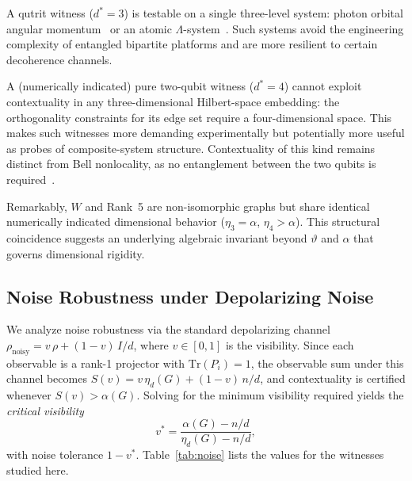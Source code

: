 \documentclass[aps,pra,twocolumn,superscriptaddress,longbibliography,floatfix]{revtex4-2}
\newcommand{\vt}{\vartheta}
\newcommand{\al}{\alpha}
\begin{document}
A qutrit witness ($d^*=3$) is testable on a single three-level system:
photon orbital angular momentum~\cite{Molina-Terriza2007}
or an atomic $\Lambda$-system~\cite{Hu2016}.
Such systems avoid the engineering complexity of entangled bipartite
platforms and are more resilient to certain decoherence channels.

A (numerically indicated) pure two-qubit witness ($d^*=4$) cannot exploit
contextuality in any three-dimensional Hilbert-space embedding: the
orthogonality constraints for its edge set require a four-dimensional
space.
This makes such witnesses more demanding experimentally but potentially more
useful as probes of composite-system structure.
Contextuality of this kind remains distinct from Bell nonlocality, as no
entanglement between the two qubits is required~\cite{Spekkens2005,Porto2024}.

Remarkably, $W$ and Rank~5 are non-isomorphic graphs but share identical
numerically indicated dimensional behavior ($\eta_3=\al$, $\eta_4>\al$).
This structural coincidence suggests an underlying algebraic invariant
beyond $\vt$ and $\al$ that governs dimensional rigidity.

\subsection{Noise Robustness under Depolarizing Noise}

We analyze noise robustness via the standard depolarizing channel
$\rho_\text{noisy} = v\,\rho + (1-v)\,I/d$,
where $v\in[0,1]$ is the visibility.
Since each observable is a rank-1 projector with $\mathrm{Tr}(P_i)=1$,
the observable sum under this channel becomes
$S(v) = v\,\eta_d(G) + (1-v)\,n/d$,
and contextuality is certified whenever $S(v)>\al(G)$.
Solving for the minimum visibility required yields the
\emph{critical visibility}
\begin{equation}
  v^* = \frac{\al(G) - n/d}{\eta_d(G) - n/d},
  \label{eq:vstar}
\end{equation}
with noise tolerance $1-v^*$.
Table~\ref{tab:noise} lists the values for the witnesses studied here.
\end{document}
